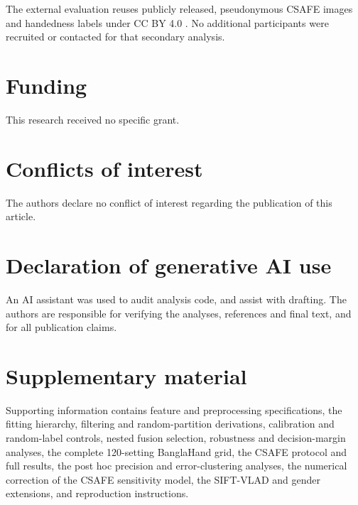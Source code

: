 The external evaluation reuses publicly released, pseudonymous CSAFE images and handedness labels under CC BY 4.0 \cite{crawford2020database,crawford2026csafe}. No additional participants were recruited or contacted for that secondary analysis.

\section*{Funding}
This research received no specific grant.

\section*{Conflicts of interest}
The authors declare no conflict of interest regarding the publication of this article.

\section*{Declaration of generative AI use}
An AI assistant was used to audit analysis code, and assist with drafting. The authors are responsible for verifying the analyses, references and final text, and for all publication claims.

\section*{Supplementary material}
Supporting information contains feature and preprocessing specifications, the fitting hierarchy, filtering and random-partition derivations, calibration and random-label controls, nested fusion selection, robustness and decision-margin analyses, the complete 120-setting BanglaHand grid, the CSAFE protocol and full results, the post hoc precision and error-clustering analyses, the numerical correction of the CSAFE sensitivity model, the SIFT-VLAD and gender extensions, and reproduction instructions.
